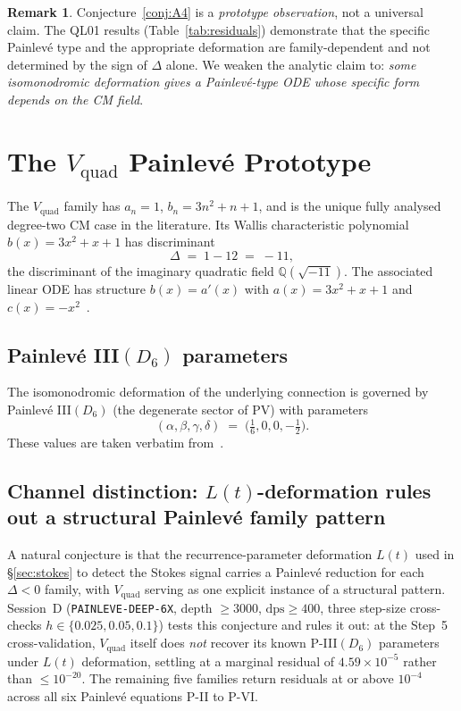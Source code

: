 \documentclass[11pt,reqno]{amsart}
\theoremstyle{definition}
\newtheorem{remark}[theorem]{Remark}
\begin{document}
\begin{remark}\label{rem:prototype}
Conjecture~\ref{conj:A4} is a \emph{prototype observation},
not a universal claim. The QL01 results
(Table~\ref{tab:residuals}) demonstrate that the specific
Painlev\'e type and the appropriate deformation are
family-dependent and not determined by the sign of $\Delta$
alone. We weaken the analytic claim to:
\emph{some isomonodromic deformation gives a Painlev\'e-type
ODE whose specific form depends on the CM field}.
\end{remark}

\section{The $V_{\mathrm{quad}}$ Painlev\'e Prototype}
\label{sec:vquad}

The $V_{\mathrm{quad}}$ family has
$a_{n}=1$, $b_{n} = 3n^{2}+n+1$, and is the unique fully
analysed degree-two CM case in the literature. Its Wallis
characteristic polynomial $b(x) = 3x^{2} + x + 1$ has
discriminant
\[
\Delta \;=\; 1 - 12 \;=\; -11,
\]
the discriminant of the imaginary quadratic field
$\mathbb{Q}(\sqrt{-11})$. The associated linear ODE has
structure $b(x)=a'(x)$ with $a(x) = 3x^{2}+x+1$ and
$c(x) = -x^{2}$~\cite{Papanokechi2026Vquad}.

\subsection{Painlev\'e III$(D_{6})$ parameters}

The isomonodromic deformation of the underlying connection is
governed by Painlev\'e III$(D_{6})$ (the degenerate sector of
PV) with parameters
\[
(\alpha, \beta, \gamma, \delta) \;=\;
\big(\tfrac{1}{6}, 0, 0, -\tfrac{1}{2}\big).
\]
These values are taken verbatim from~\cite[\S 2]{Papanokechi2026Vquad}.

\subsection{Channel distinction: $L(t)$-deformation rules out a
structural Painlev\'e family pattern}
\label{ssec:painleve-deep-channel}

A natural conjecture is that the recurrence-parameter
deformation $L(t)$ used in \S\ref{sec:stokes} to detect the
Stokes signal carries a Painlev\'e reduction for each
$\Delta<0$ family, with $V_{\mathrm{quad}}$ serving as one
explicit instance of a structural pattern. Session~D
(\texttt{PAINLEVE-DEEP-6X}, depth $\geq 3000$,
$\mathrm{dps}\geq 400$, three step-size cross-checks
$h\in\{0.025,0.05,0.1\}$) tests this conjecture and rules it
out: at the Step~5 cross-validation, $V_{\mathrm{quad}}$
itself does \emph{not} recover its known
P-III$(D_{6})$ parameters under $L(t)$ deformation, settling
at a marginal residual of $4.59\times 10^{-5}$ rather than
$\leq 10^{-20}$. The remaining five families return residuals
at or above $10^{-4}$ across all six Painlev\'e equations
P-II to P-VI.
\end{document}
